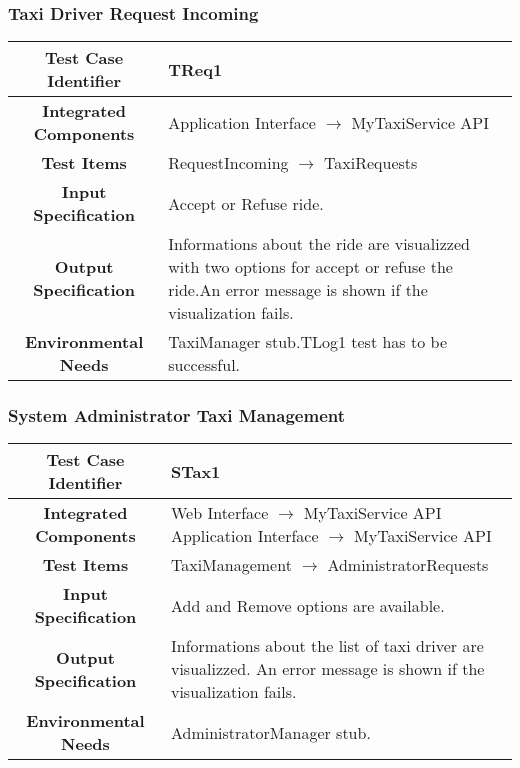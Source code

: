 \documentclass[11pt, a4paper,titlepage]{article}
\begin{document}
	\subsubsection{Taxi Driver Request Incoming}
	\begin{tabularx}{\textwidth}{| c|X|}
		\hline \textbf{Test Case Identifier} & \label{TReq1}TReq1 \\
		\hline \textbf{Integrated Components} & Application Interface $\rightarrow $ MyTaxiService API \\
		\hline \textbf{Test Items} & RequestIncoming $\rightarrow $ TaxiRequests \\
		\hline \textbf{Input Specification} & Accept or Refuse ride. \\
		\hline \textbf{Output Specification} & Informations about the ride are visualizzed with two options for accept or refuse the ride.\newline An error message is shown if the visualization fails. \\
		\hline \textbf{Environmental Needs} & TaxiManager stub.\newline TLog1  test has to be successful. \\
		\hline
	\end{tabularx}
	\newline
	\newline
	\subsubsection{System Administrator Taxi Management}
	\begin{tabularx}{\textwidth}{| c|X|}
		\hline \textbf{Test Case Identifier} & \label{STax1}STax1 \\
		\hline \textbf{Integrated Components} & Web Interface $\rightarrow $ MyTaxiService API \newline 
		Application Interface $\rightarrow $ MyTaxiService API \\
		\hline \textbf{Test Items} & TaxiManagement $\rightarrow $ AdministratorRequests \\
		\hline \textbf{Input Specification} & Add and Remove options are available. \\
		\hline \textbf{Output Specification} & Informations about the list of taxi driver are visualizzed.\newline
		An error message is shown if the visualization fails. \\
		\hline \textbf{Environmental Needs} & AdministratorManager stub. \\
		\hline
	\end{tabularx}
	\newline
	\newline
\end{document}

